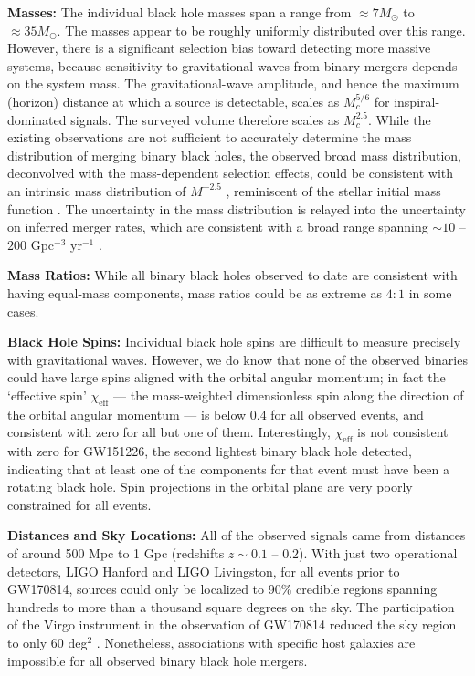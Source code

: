 \documentclass[iop,onecolumn]{revtex4-1}
\begin{document}
\textbf{Masses:} The individual black hole masses span a range from $\approx 7 M_\odot$ to $\approx 35 M_\odot$.  The masses appear to be roughly uniformly distributed over this range.  However, there is a significant selection bias  toward detecting more massive systems, because sensitivity to gravitational waves from binary mergers depends on the system mass.  The gravitational-wave amplitude, and hence the maximum (horizon) distance at which a source is detectable, scales as $M_c^{5/6}$ for inspiral-dominated signals. The surveyed volume therefore scales as $M_c^{2.5}$.  While the existing observations are not sufficient to accurately determine the mass distribution of merging binary black holes, the observed broad mass distribution, deconvolved with the mass-dependent selection effects, could be consistent with an intrinsic mass distribution of $M^{-2.5}$ \citep{BBH:O1,GW170104}, reminiscent of the stellar initial mass function \citep{Salpeter:1955}.  The uncertainty in the mass distribution is relayed into the uncertainty on inferred merger rates, which are consistent with a broad range spanning $\sim 10$ -- $200$ Gpc$^{-3}$ yr$^{-1}$ \citep{GW170104}.  

\textbf{Mass Ratios:} While all binary black holes observed to date are consistent with having equal-mass components, mass ratios could be as extreme as $4:1$ in some cases.  

\textbf{Black Hole Spins:} Individual black hole spins are difficult to measure precisely with gravitational waves.  However, we do know that none of the observed binaries could have large spins aligned with the orbital angular momentum; in fact the `effective spin' $\chi_\textrm{eff}$ --- the mass-weighted dimensionless spin along the direction of the orbital angular momentum --- is below $0.4$ for all observed events, and consistent with zero for all but one of them.  Interestingly, $\chi_\textrm{eff}$ is not consistent with zero for GW151226, the second lightest binary black hole detected, indicating that at least one of the components for that event must have been a rotating black hole.  Spin projections in the orbital plane are very poorly constrained for all events.

\textbf{Distances and Sky Locations:} All of the observed signals came from distances of around 500 Mpc to 1 Gpc (redshifts $z\sim 0.1$ -- $0.2$).  With just two operational detectors, LIGO Hanford and LIGO Livingston, for all events prior to GW170814, sources could only be localized to 90\% credible regions spanning hundreds to more than a thousand square degrees on the sky.  The participation of the Virgo instrument in the observation of GW170814 reduced the sky region to only 60 deg$^2$ \citep{GW170814}.  Nonetheless, associations with specific host galaxies are impossible for all observed binary black hole mergers.  
\end{document}
